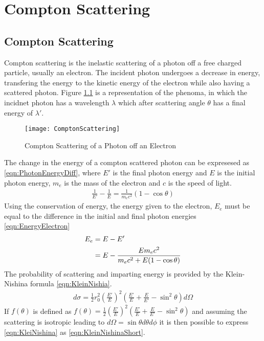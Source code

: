 \chapter{Compton Scattering}
\label{ch:ComptonScattering}
\section{Compton Scattering}
Compton scattering is the inelastic scattering of a photon off a free charged particle, usually an electron.
The incident photon undergoes a decrease in energy, transfering the energy to the kinetic energy of the electron while also having a scattered photon.
Figure \ref{fig:ComptonScattering} is a representation of the phenoma, in which the incidnet photon has a wavelength $\lambda$ which after scattering angle $\theta$ has a final energy of $\lambda'$.
\begin{figure}
  \centering
  \texttt{[image: ComptonScattering]}
  \caption{Compton Scattering of a Photon off an Electron}
  \label{fig:ComptonScattering}
\end{figure}
The change in the energy of a compton scattered photon can be expresesed as \eqref{eqn:PhotonEnergyDiff}, where $E'$ is the final photon energy and $E$ is the initial photon energy, $m_e$ is the mass of the electron and $c$ is the speed of light.
\begin{align}
  \label{eqn:FinalPhotonEnergy}
  \frac{1}{E'} -\frac{1}{E} = \frac{1}{m_e c^2}\left(1-\cos\theta\right) 
\end{align}
Using the conservation of energy, the energy given to the electron, $E_e$ must be equal to the difference in the initial and final photon energies \eqref{eqn:EnergyElectron}
\begin{align}
  \label{eqn:EnergyElectron}
  E_e &= E - E' \\ \notag
   &= E - \frac{E m_e c^2}{m_e c^2 + E (1-\cos\theta)}
\end{align}
The probability of scattering and imparting energy is provided by the Klein-Nishina formula \eqref{eqn:KleinNishia}.
\begin{align}
  \label{eqn:KleinNishina}
  d\sigma = \frac{1}{2} r_0^2 \left(\frac{E'}{E}\right)^2 \left(\frac{E'}{E} + \frac{E}{E'}-\sin^2\theta\right)d\Omega
\end{align}
If $f(\theta)$ is defined as $f(\theta) = \frac{1}{2}\left(\frac{E'}{E}\right)^2 \left(\frac{E'}{E} + \frac{E}{E'}-\sin^2\theta\right)$ and assuming the scattering is isotropic leading to $d\Omega = \sin\theta d\theta d\phi$ it is then possible to express \eqref{eqn:KleiNishina} as \eqref{eqn:KleinNishinaShort}.
